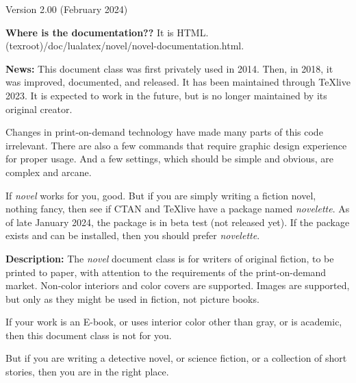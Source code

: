 \documentclass[v2]{novel} %
\begin{document}
\thispagestyle{empty}
\begin{ChapterStart}[8]
\vspace{\nbs} %
\vspace{\nbs}
{\centering Version 2.00 (February 2024)\par}
\end{ChapterStart}

\textbf{Where is the documentation??} It is HTML.\\
(texroot)/doc/lualatex/novel/novel-documentation.html.

\scenebreak

\textbf{News:} This document class was first privately used in 2014.
Then, in 2018, it was improved, documented, and released. It has been
maintained through TeXlive 2023. It is expected to work in the future, but is
no longer maintained by its original creator.\par
Changes in print-on-demand technology have made many parts of this code
irrelevant. There are also a few commands that require graphic design
experience for proper usage. And a few settings, which should be simple and
obvious, are complex and arcane.\par
If \emph{novel} works for you, good. But if you are simply writing a fiction
novel, nothing fancy, then see if CTAN and TeXlive have a package named
\emph{novelette}. As of late January 2024, the package is in beta test
(not released yet). If the package exists and can be installed, then you
should prefer \emph{novelette}. 

\scenebreak

\textbf{Description:} The \emph{novel} document class is for writers of
original fiction, to be printed to paper, with attention to the requirements
of the print-on-demand market. Non-color interiors and color covers are
supported. Images are supported, but only as they might be used in fiction,
not picture books.

If your work is an E-book, or uses interior color other than gray, or is
academic, then this document class is not for you. 

But if you are writing a detective novel, or science fiction, or a collection
of short stories, then you are in the right place.

\makeatletter\nocle@rtoendtrue\makeatother %
\end{document}
